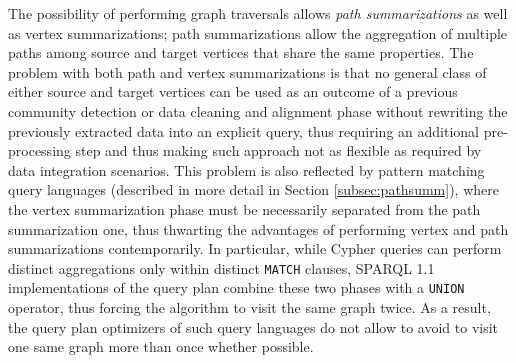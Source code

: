 The possibility of performing graph traversals allows \textit{path summarizations} as well as vertex summarizations; path summarizations  allow the aggregation of multiple paths  among source and target vertices that share the same properties. The problem with both path and vertex summarizations is that no general class of either source and target vertices can be used as an outcome of a previous community detection \cite{xie,berlingerio11} or data cleaning and alignment phase \cite{ALIEH17} without rewriting the previously extracted data into an explicit query, thus requiring an additional pre-processing step and thus making such approach not as flexible as required by data integration scenarios. %
This problem is also reflected by pattern matching query languages (described in more detail in Section \ref{subsec:pathsumm}), where the vertex summarization phase must be necessarily separated from the path summarization one, thus thwarting the advantages of performing vertex and path summarizations contemporarily. In particular, while Cypher queries can perform distinct aggregations only within distinct \texttt{MATCH} clauses, SPARQL 1.1 implementations of the query plan combine these two phases with a \texttt{UNION} operator, thus forcing the algorithm to visit the same graph twice. As a result, the query plan optimizers of such query languages do not allow to avoid to visit one same graph more than once whether possible.  


